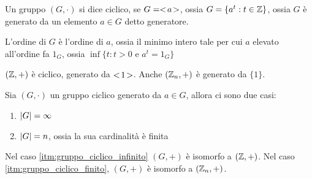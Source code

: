\begin{defn}
Un gruppo $(G, \cdot)$ si dice ciclico, se $G = <\!{a}\!>$, ossia $G = \{ a^{t} : t \in \mathbb{Z} \}$, ossia $G$ \`e generato da un elemento $a \in G$ detto generatore.

L'ordine di $G$ \`e l'ordine di $a$, ossia il minimo intero tale per cui $a$ elevato all'ordine fa $1_G$, ossia $\inf \{ t : t > 0 \text{ e } a^t = 1_G \}$
\end{defn}

$(\mathbb{Z}, +)$ \`e ciclico, generato da $<\!{1}\!>$. Anche $(\mathbb{Z}_n, +)$ \`e generato da $\{ 1 \}$.

\begin{theorem}
Sia $(G, \cdot)$ un gruppo ciclico generato da $a \in G$, allora ci sono due casi:
\begin{enumerate}
    \item\label{itm:gruppo_ciclico_infinito} $\left\lvert{G}\right\rvert = \infty$
    \item\label{itm:gruppo_ciclico_finito} $\left\lvert{G}\right\rvert = n$, ossia la sua cardinalit\`a \`e finita
\end{enumerate}
Nel caso \ref{itm:gruppo_ciclico_infinito} $(G,+)$ \`e isomorfo a $(\mathbb{Z},+)$. Nel caso \ref{itm:gruppo_ciclico_finito}, $(G, +)$ \`e isomorfo a $(\mathbb{Z}_n, +)$.
\end{theorem}

